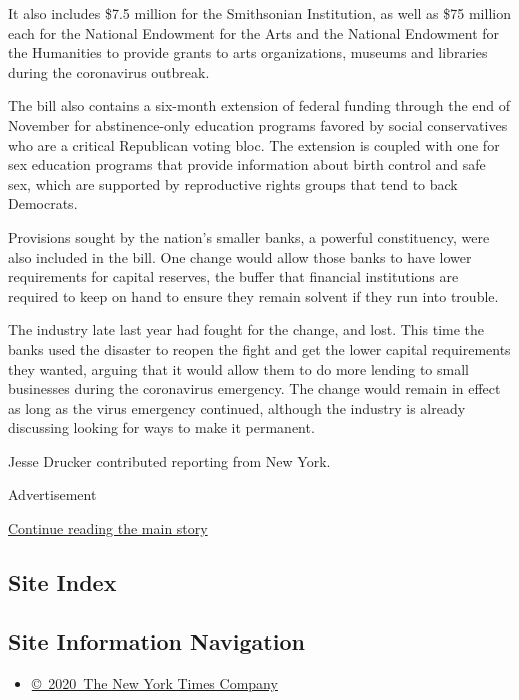 It also includes \$7.5 million for the Smithsonian Institution, as well
as \$75 million each for the National Endowment for the Arts and the
National Endowment for the Humanities to provide grants to arts
organizations, museums and libraries during the coronavirus outbreak.

The bill also contains a six-month extension of federal funding through
the end of November for abstinence-only education programs favored by
social conservatives who are a critical Republican voting bloc. The
extension is coupled with one for sex education programs that provide
information about birth control and safe sex, which are supported by
reproductive rights groups that tend to back Democrats.

Provisions sought by the nation's smaller banks, a powerful
constituency, were also included in the bill. One change would allow
those banks to have lower requirements for capital reserves, the buffer
that financial institutions are required to keep on hand to ensure they
remain solvent if they run into trouble.

The industry late last year had fought for the change, and lost. This
time the banks used the disaster to reopen the fight and get the lower
capital requirements they wanted, arguing that it would allow them to do
more lending to small businesses during the coronavirus emergency. The
change would remain in effect as long as the virus emergency continued,
although the industry is already discussing looking for ways to make it
permanent.

Jesse Drucker contributed reporting from New York.

Advertisement

\protect\hyperlink{after-bottom}{Continue reading the main story}

\hypertarget{site-index}{%
\subsection{Site Index}\label{site-index}}

\hypertarget{site-information-navigation}{%
\subsection{Site Information
Navigation}\label{site-information-navigation}}

\begin{itemize}
\tightlist
\item
  \href{https://help.nytimes.com/hc/en-us/articles/115014792127-Copyright-notice}{©~2020~The
  New York Times Company}
\end{itemize}

